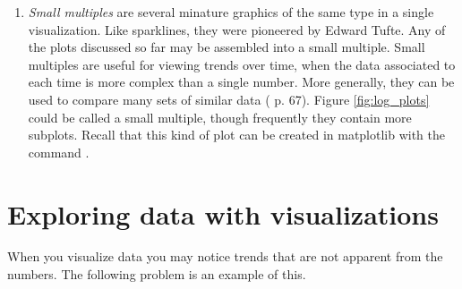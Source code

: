 \begin{enumerate}
\item \emph{Small multiples} are several minature graphics of the same type in a single visualization. 
Like sparklines, they were pioneered by Edward Tufte. Any of the plots discussed so far may be assembled into a small multiple. 
Small multiples are useful for viewing trends over time, when the data associated to each time is more complex than a single number. 
More generally, they can be used to compare many sets of similar data (\cite{tufte1990} p. 67). 
Figure \ref{fig:log_plots} could be called a small multiple, though frequently they contain more subplots. 
Recall that this kind of plot can be created in matplotlib with the command .
\end{enumerate}



\section*{Exploring data with visualizations}
When you visualize data you may notice trends that are not apparent from the numbers. 
The following problem is an example of this.


